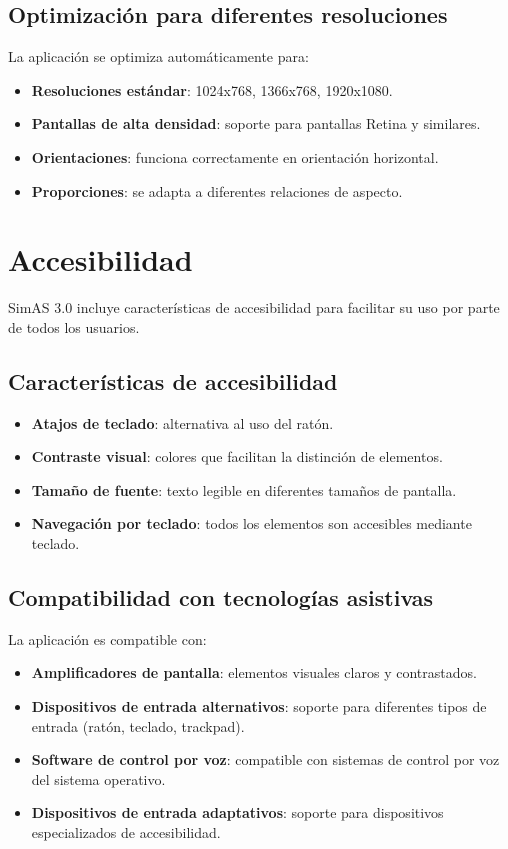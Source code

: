 \subsection{Optimización para diferentes resoluciones}

La aplicación se optimiza automáticamente para:

\begin{itemize}
    \item \textbf{Resoluciones estándar}: 1024x768, 1366x768, 1920x1080.
    \item \textbf{Pantallas de alta densidad}: soporte para pantallas Retina y similares.
    \item \textbf{Orientaciones}: funciona correctamente en orientación horizontal.
    \item \textbf{Proporciones}: se adapta a diferentes relaciones de aspecto.
\end{itemize}

\section{Accesibilidad}

SimAS 3.0 incluye características de accesibilidad para facilitar su uso por parte de todos los usuarios.

\subsection{Características de accesibilidad}

\begin{itemize}
    \item \textbf{Atajos de teclado}: alternativa al uso del ratón.
    \item \textbf{Contraste visual}: colores que facilitan la distinción de elementos.
    \item \textbf{Tamaño de fuente}: texto legible en diferentes tamaños de pantalla.
    \item \textbf{Navegación por teclado}: todos los elementos son accesibles mediante teclado.
\end{itemize}

\subsection{Compatibilidad con tecnologías asistivas}

La aplicación es compatible con:

\begin{itemize}
    \item \textbf{Amplificadores de pantalla}: elementos visuales claros y contrastados.
    \item \textbf{Dispositivos de entrada alternativos}: soporte para diferentes tipos de entrada (ratón, teclado, trackpad).
    \item \textbf{Software de control por voz}: compatible con sistemas de control por voz del sistema operativo.
    \item \textbf{Dispositivos de entrada adaptativos}: soporte para dispositivos especializados de accesibilidad.
\end{itemize}

